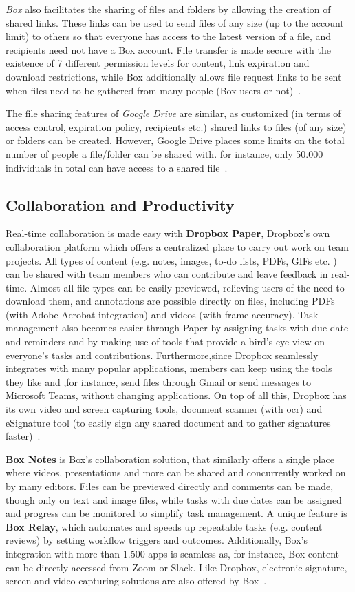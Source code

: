 \textit{Box} also facilitates the sharing of files and folders by allowing the creation of shared links. These links can be used to send files of any size (up to the account limit) to others so that everyone has access to the latest version of a file, and recipients need not have a Box account. File transfer is made secure with the existence of 7 different permission levels for content, link expiration and download restrictions, while Box additionally allows file request links to be sent when files need to be gathered from many people (Box users or not)~\cite{box}.

The file sharing features of \textit{Google Drive} are similar, as customized (in terms of access control, expiration policy, recipients etc.) shared links to files (of any size) or folders can be created. However, Google Drive places some limits on the total number of people a file/folder can be shared with. for instance, only 50.000 individuals in total can have access to a shared file~\cite{google_drive,drive_sharing_limits}.

\subsection{Collaboration and Productivity}
Real-time collaboration is made easy with \textbf{Dropbox Paper}, Dropbox's own collaboration platform which offers a centralized place to carry out work on team projects. All types of content (e.g. notes, images, to-do lists, PDFs, GIFs etc. ) can be shared with team members who can contribute and leave feedback in real-time. Almost all file types can be easily previewed, relieving users of the need to download them, and annotations are possible directly on files, including PDFs (with Adobe Acrobat integration) and videos (with frame accuracy). Task management also becomes easier through Paper by assigning tasks with due date and reminders and by making use of tools that provide a bird's eye view on everyone's tasks and contributions. Furthermore,since Dropbox seamlessly integrates with many popular applications, members can keep using the tools they like and ,for instance, send files through Gmail or send messages to Microsoft Teams, without changing applications. On top of all this, Dropbox has its own video and screen capturing tools, document scanner (with \ac{ocr}) and eSignature tool (to easily sign any shared document and to gather signatures faster)~\cite{dropbox,dropbox_requests}.

\textbf{Box Notes} is Box's collaboration solution, that similarly offers a single place where videos, presentations and more can be shared and concurrently worked on by many editors. Files can be previewed directly and comments can be made, though only on text and image files, while tasks with due dates can be assigned and progress can be monitored to simplify task management. A unique feature is \textbf{Box Relay}, which automates and speeds up repeatable tasks (e.g. content reviews) by setting workflow triggers and outcomes. Additionally, Box's integration with more than 1.500 apps is seamless as, for instance, Box content can be directly accessed from Zoom or Slack. Like Dropbox, electronic signature, screen and video capturing solutions are also offered by Box~\cite{box,box_annotations}.

